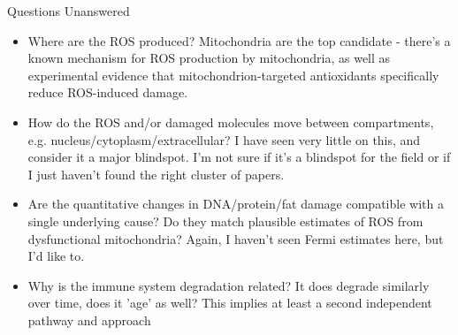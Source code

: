 \begin{frame}[c]{Questions Unanswered}
    \begin{itemize}[<+(1)->]
        \item Where are the ROS produced? Mitochondria are the top candidate - there’s a known mechanism for ROS production by mitochondria, as well as experimental evidence that mitochondrion-targeted antioxidants specifically reduce ROS-induced damage.
        \item How do the ROS and/or damaged molecules move between compartments, e.g. nucleus/cytoplasm/extracellular? I have seen very little on this, and consider it a major blindspot. I’m not sure if it’s a blindspot for the field or if I just haven’t found the right cluster of papers.
        \item Are the quantitative changes in DNA/protein/fat damage compatible with a single underlying cause? Do they match plausible estimates of ROS from dysfunctional mitochondria? Again, I haven’t seen Fermi estimates here, but I’d like to.
        \item Why is the immune system degradation related? It does degrade similarly over time, does it 'age' as well? This implies at least a second independent pathway and approach
    \end{itemize}
\end{frame}
